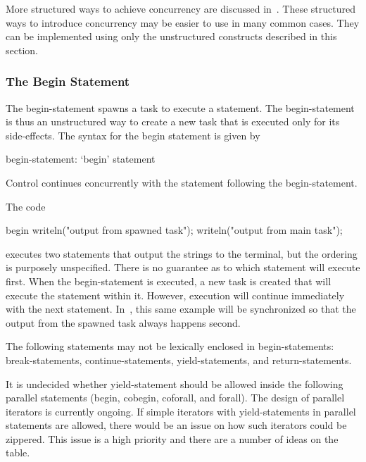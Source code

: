 More structured ways to achieve concurrency are discussed
in~.  These structured ways to
introduce concurrency may be easier to use in many common cases.  They
can be implemented using only the unstructured constructs described in
this section.

\subsubsection{The Begin Statement}
\label{Begin}

The begin-statement spawns a task to execute a statement.  The
begin-statement is thus an unstructured way to create a new task that
is executed only for its side-effects.  The syntax for the begin
statement is given by
\begin{syntax}
begin-statement:
  `begin' statement
\end{syntax}
Control continues concurrently with the statement following the
begin-statement.

\begin{example}
The code
\begin{chapel}
begin writeln("output from spawned task");
writeln("output from main task");
\end{chapel}
executes two  statements that output the strings to the
terminal, but the ordering is purposely unspecified.  There is no
guarantee as to which statement will execute first.  When the
begin-statement is executed, a new task is created that will execute
the  statement within it.  However, execution will
continue immediately with the next statement.
In~, this same example will be synchronized so
that the output from the spawned task always happens second.
\end{example}

The following statements may not be lexically enclosed in
begin-statements: break-statements, continue-statements,
yield-statements, and return-statements.
\begin{openissue}
It is undecided whether yield-statement should be allowed inside the
following parallel statements (begin, cobegin, coforall, and forall).
The design of parallel iterators is currently ongoing.  If simple
iterators with yield-statements in parallel statements are allowed,
there would be an issue on how such iterators could be zippered.  This
issue is a high priority and there are a number of ideas on the table.
\end{openissue}

